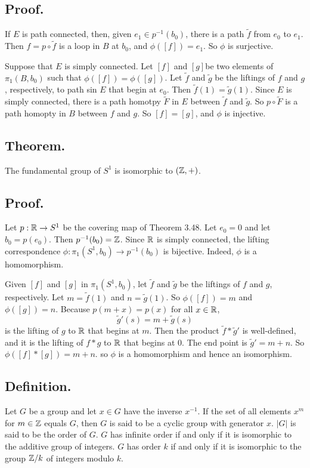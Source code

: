 \documentclass[titlepage]{article}
\begin{document}
\subsection{Proof.} If $E$ is path connected, then, given $e_{1} \in p^{-1}(b_{0})$, there is a path $\tilde{f}$ from $e_{0}$ to $e_{1}$. Then $f = p \circ \tilde{f}$ is a loop in $B$ at $b_{0}$, and $\phi([f]) = e_{1}$. So $\phi$ is surjective.

Suppose that $E$ is simply connected. Let $[f]$ and $[g]$be two elements of $\pi_{1}(B, b_{0})$ such that $\phi([f]) = \phi([g])$. Let $\tilde{f}$ and $\tilde{g}$ be the liftings of $f$ and $g$, respectively, to path sin $E$ that begin at $e_{0}$. Then $\tilde{f}(1) = \tilde{g}(1)$. Since $E$ is simply connected, there is a path homotpy $\tilde{F}$ in $E$ between $\tilde{f}$ and $\tilde{g}$. So $p \circ \tilde{F}$ is a path homopty in $B$ between $f$ and $g$. So $[f] = [g]$, and $\phi$ is injective.

\subsection{Theorem.} The fundamental group of $S^{1}$ is isomorphic to $(\mathbb{Z}, +)$.

\subsection{Proof.} Let $p: \mathbb{R} \to S^{1}$ be the covering map of Theorem 3.48. Let $e_{0} = 0$ and let $b_{0} = p(e_{0})$. Then $p^{-1}(b_{0}) = \mathbb{Z}$. Since $\mathbb{R}$ is simply connected, the lifting correspondence $\phi: \pi_{1}(S^{1}, b_{0}) \to p^{-1}(b_{0})$ is bijective. Indeed, $\phi$ is a homomorphism.

Given $[f]$ and $[g]$ in $\pi_{1}(S^{1}, b_{0})$, let $\tilde{f}$ and $\tilde{g}$ be the liftings of $f$ and $g$, respectively. Let $m = \tilde{f}(1)$ and $n = \tilde{g}(1)$. So $\phi([f]) = m$ and $\phi([g]) = n$. Because $p(m + x) = p(x)$ for all $x \in \mathbb{R}$, 
$$\tilde{g}'(s) = m + \tilde{g}(s)$$
is the lifting of $g$ to $\mathbb{R}$ that begins at $m$. Then the product $\tilde{f} * \tilde{g}'$ is well-defined, and it is the lifting of $f * g$ to $\mathbb{R}$ that begins at $0$. The end point is $\tilde{g}' = m + n$. So $\phi([f] * [g]) = m + n$. so $\phi$ is a homomorphism and hence an isomorphism.

\subsection{Definition.} Let $G$ be a group and let $x \in G$ have the inverse $x^{-1}$. If the set of all elements $x^{m}$ for $m \in \mathbb{Z}$ equals $G$, then $G$ is said to be a cyclic group with generator $x$. $|G|$ is said to be the order of $G$. $G$ has infinite order if and only if it is isomorphic to the additive group of integers. $G$ has order $k$ if and only if it is isomorphic to the group $\mathbb{Z} / k$ of integers modulo $k$.
\end{document}

